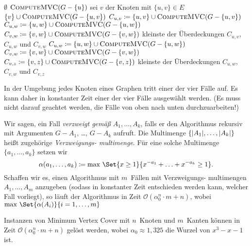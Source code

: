 \documentclass{cheat-sheet}
\newcommand{\size}[1]{\abs{#1}} %
\renewcommand{\O}{\mathcal{O}} %
\begin{document}
\begin{algorithmic}
     \Return $\emptyset$ \EndIf
      \State \Return $\Call{ComputeMVC}{G - \{ u \}}$
    \EndIf
      \State sei $v$ der Knoten mit $\{ u, v \} \in E$
      \State \Return $\{ v \} \cup \Call{ComputeMVC}{G - \{ u, v \}}$
    \EndIf
      \State $C_{u,v} \coloneqq \{u, v\} \cup \Call{ComputeMVC}{G - \{ u, v \}}$
      \State $C_{u,w} \coloneqq \{u, w\} \cup \Call{ComputeMVC}{G - \{ u, w \}}$
      \State $C_{v,w} \coloneqq \{v, w\} \cup \Call{ComputeMVC}{G - \{ v, w \}}$
      \State \Return kleinste der Überdeckungen $C_{u,v}$, $C_{u,w}$ und $C_{v,w}$
    \EndIf
      \State $C_{u,w} \coloneqq \{u, w\} \cup \Call{ComputeMVC}{G - \{ u, w \}}$
      \State $C_{v,w} \coloneqq \{v, w\} \cup \Call{ComputeMVC}{G - \{ v, w \}}$
      \State $C_{v,z} \coloneqq \{v, z\} \cup \Call{ComputeMVC}{G - \{ v, z \}}$
      \State \Return kleinste der Überdeckungen $C_{u,w}$, $C_{v,w}$ und $C_{v,z}$
    \EndIf
  \EndFunction
\end{algorithmic}

\begin{bem}
  In der Umgebung jedes Knoten eines Graphen tritt einer der vier Fälle auf.
  Es kann daher in konstanter Zeit einer der vier Fälle ausgewählt werden.
  (Es muss nicht darauf geachtet werden, die Fälle von oben nach unten durchzuarbeiten!)
\end{bem}

Wir sagen, ein Fall \textit{verzweigt gemäß} $A_1, \ldots, A_k$, falls er den Algorithmus rekursiv mit Argumenten $G - A_1$, \ldots, $G - A_k$ aufruft.
Die Multimenge $\{ \size{A_1}, \ldots, \size{A_k} \}$ heißt zugehörige \textit{Verzweigungs- multimenge}.
Für eine solche Multimenge $\{ a_1, \ldots, a_k \}$ setzen wir
\[ \alpha(a_1, \ldots, a_k) \coloneqq \max \, \Set{x \geq 1}{x^{-a_1} + \ldots + x^{-a_k} \geq 1}. \]
Schaffen wir es, einen Algorithmus mit $m$~Fällen mit Verzweigungs- multimengen $A_1, \ldots, A_m$ anzugeben (sodass in konstanter Zeit entschieden werden kann, welcher Fall vorliegt), so läuft der Algorithmus in Zeit $\O(\alpha_0^n \cdot m + n)$, wobei $\max \, \Set{\alpha(A_i)}{i = 1, \ldots, m}$

\begin{satz}
  Instanzen von Minimum Vertex Cover mit $n$~Knoten und $m$~Kanten können in Zeit $\O(\alpha_0^n \cdot m + n)$ gelöst werden, wobei $\alpha_0 \approx 1,325$ die Wurzel von $x^3 - x - 1$ ist.
\end{satz}
\end{document}
